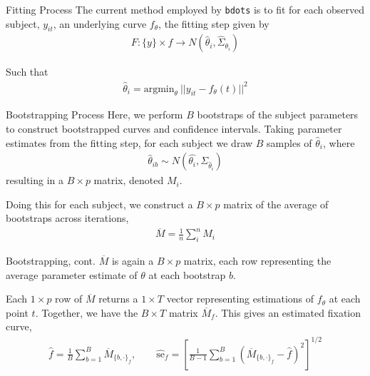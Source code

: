 \documentclass{beamer}
\newcommand{\code}[1]{\texttt{#1}}
\begin{document}
\begin{frame}{Fitting Process}
The current method employed by \code{bdots} is to fit for each observed subject, $y_{it}$, an underlying curve $f_{\theta}$, the fitting step given by 
  \begin{align*}
  F: \{y\} \times f \rightarrow N \left(\hat{\theta}_i, \hat{\Sigma}_{\theta_i} \right)
  \end{align*}

Such that
  \begin{align*}
  \hat{\theta}_i = \text{argmin}_{\theta} \  ||y_{it} - f_{\theta}(t)||^2
  \end{align*}

\end{frame}


\begin{frame}{Bootstrapping Process}
Here, we perform $B$ bootstraps of the subject parameters to construct bootstrapped curves and confidence intervals. Taking parameter estimates from the fitting step, for each subject we draw $B$ samples of $\hat{\theta}_i$, where 
\begin{align*}
\hat{\theta}_{ib} \sim N \left(\hat{\theta_i},  \Sigma_{\hat{\theta}_i} \right)
\end{align*}
resulting in a $B\times p$ matrix, denoted $M_i$. \newline 

Doing this for each subject, we construct a $B\times p$ matrix of the average of bootstraps across iterations, 
\begin{align*}
\overline{M} = \frac1n \sum_{i}^n M_i
\end{align*}
\end{frame}

\begin{frame}{Bootstrapping, cont.}
$\overline{M}$ is again a $B \times p$ matrix, each row  representing the average parameter estimate of $\theta$ at each bootstrap $b$. \newline 

Each $1\times p$ row of $\overline{M}$ returns a $1 \times T$ vector representing estimations of $f_{\theta}$ at each point $t$. Together, we have the $B \times T$ matrix $\overline{M}_f$. This gives an estimated fixation curve, 
\begin{align*}
\hat{f} = \frac1B \sum_{b=1}^B \overline{M}_{\{b, \cdot\}_f}, \qquad \widehat{\text{se}}_{f} = \left[ \frac{1}{B-1} \sum_{b=1}^B \left( \overline{M}_{\{b, \cdot\}_{f}} - \hat{f} \right)^2 \right]^{1/2} 
\end{align*}
\end{frame}
\end{document}
